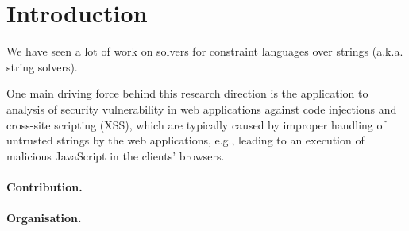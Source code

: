 \section{Introduction}

We have seen  a lot of work on solvers for constraint languages over strings (a.k.a. string solvers). 

One main driving force behind this research direction is the application to analysis of security vulnerability in web applications against code injections and cross-site scripting (XSS), which are typically caused by improper handling of untrusted strings by the web applications, e.g., leading to an execution of malicious JavaScript in the clients' browsers. 




\cite{LB16,TCJ16,YABI14}

\paragraph{Contribution.}

\paragraph{Organisation.} 

